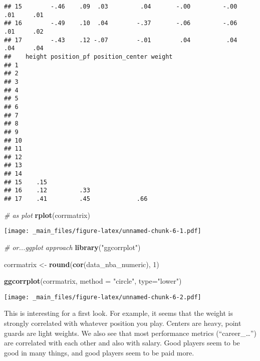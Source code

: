 \documentclass[
]{book}
\newenvironment{Shaded}{\begin{snugshade}}{\end{snugshade}}
\newcommand{\AttributeTok}[1]{\textcolor[rgb]{0.13,0.29,0.53}{#1}}
\newcommand{\CommentTok}[1]{\textcolor[rgb]{0.56,0.35,0.01}{\textit{#1}}}
\newcommand{\DecValTok}[1]{\textcolor[rgb]{0.00,0.00,0.81}{#1}}
\newcommand{\FunctionTok}[1]{\textcolor[rgb]{0.13,0.29,0.53}{\textbf{#1}}}
\newcommand{\NormalTok}[1]{#1}
\newcommand{\OtherTok}[1]{\textcolor[rgb]{0.56,0.35,0.01}{#1}}
\newcommand{\StringTok}[1]{\textcolor[rgb]{0.31,0.60,0.02}{#1}}
\begin{document}
\begin{verbatim}
## 15        -.46    .09  .03         .04       -.00         -.00     .01     .01
## 16        -.49    .10  .04        -.37       -.06         -.06     .01     .02
## 17        -.43    .12 -.07        -.01        .04          .04     .04     .04
##    height position_pf position_center weight
## 1                                           
## 2                                           
## 3                                           
## 4                                           
## 5                                           
## 6                                           
## 7                                           
## 8                                           
## 9                                           
## 10                                          
## 11                                          
## 12                                          
## 13                                          
## 14                                          
## 15    .15                                   
## 16    .12         .33                       
## 17    .41         .45             .66
\end{verbatim}

\begin{Shaded}
\begin{Highlighting}[]
\CommentTok{\# as plot}
\FunctionTok{rplot}\NormalTok{(corrmatrix)}
\end{Highlighting}
\end{Shaded}

\texttt{[image: \_main\_files/figure-latex/unnamed-chunk-6-1.pdf]}

\begin{Shaded}
\begin{Highlighting}[]
\CommentTok{\# or...ggplot approach}
\FunctionTok{library}\NormalTok{(}\StringTok{"ggcorrplot"}\NormalTok{)}

\NormalTok{corrmatrix }\OtherTok{\textless{}{-}} \FunctionTok{round}\NormalTok{(}\FunctionTok{cor}\NormalTok{(data\_nba\_numeric), }\DecValTok{1}\NormalTok{)}

\FunctionTok{ggcorrplot}\NormalTok{(corrmatrix,}
           \AttributeTok{method =} \StringTok{"circle"}\NormalTok{,}
           \AttributeTok{type=}\StringTok{"lower"}\NormalTok{)}
\end{Highlighting}
\end{Shaded}

\texttt{[image: \_main\_files/figure-latex/unnamed-chunk-6-2.pdf]}

This is interesting for a first look. For example, it seems that the weight is
strongly correlated with whatever position you play. Centers are heavy, point
guards are light weights.
We also see that most performance metrics (``career\_\ldots{}'') are correlated with each
other and also with salary. Good players seem to be good in many things, and
good players seem to be paid more.
\end{document}
